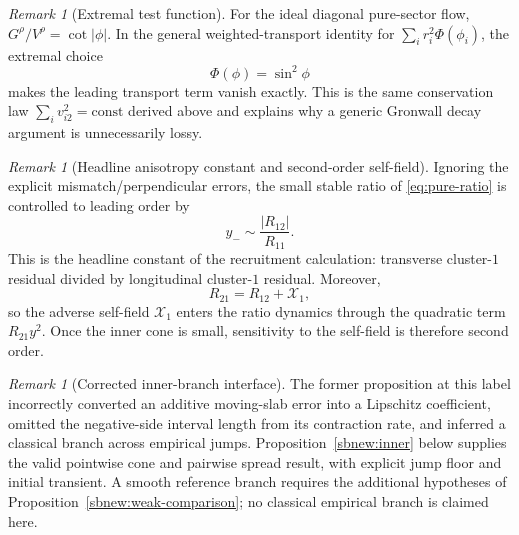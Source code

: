 \documentclass{article} %
\theoremstyle{plain}
\theoremstyle{definition}
\theoremstyle{remark}
\newtheorem{remark}[theorem]{Remark}
\begin{document}
\begin{remark}[Extremal test function]
For the ideal diagonal pure-sector flow,
$G^\rho/V^\rho=\cot|\phi|$.  In the general weighted-transport identity
for $\sum_i r_i^2\Phi(\phi_i)$, the extremal choice
\[
\Phi(\phi)=\sin^2\phi
\]
makes the leading transport term vanish exactly.  This is the same
conservation law $\sum_i v_{i2}^2=\mathrm{const}$ derived above and explains
why a generic Gronwall decay argument is unnecessarily lossy.
\end{remark}


\begin{remark}[Headline anisotropy constant and second-order self-field]
Ignoring the explicit mismatch/perpendicular errors, the small stable ratio
of \eqref{eq:pure-ratio} is controlled to leading order by
\[
\boxed{
y_-
\sim
\frac{|R_{12}|}{R_{11}}.
}
\]
This is the headline constant of the recruitment calculation: transverse
cluster-$1$ residual divided by longitudinal cluster-$1$ residual.  Moreover,
\[
R_{21}=R_{12}+\mathcal X_1,
\]
so the adverse self-field $\mathcal X_1$ enters the ratio dynamics through
the quadratic term $R_{21}y^2$.  Once the inner cone is small, sensitivity
to the self-field is therefore second order.
\end{remark}


\begin{remark}[Corrected inner-branch interface]
\label{prop:inner-strong-branch-interface}
The former proposition at this label incorrectly converted an additive
moving-slab error into a Lipschitz coefficient, omitted the negative-side
interval length from its contraction rate, and inferred a classical
branch across empirical jumps. Proposition~\ref{sbnew:inner} below supplies
the valid pointwise cone and pairwise spread result, with explicit jump
floor and initial transient. A smooth reference branch requires the
additional hypotheses of Proposition~\ref{sbnew:weak-comparison}; no
classical empirical branch is claimed here.
\end{remark}

\end{document}
